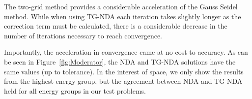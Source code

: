 \DIFdelend %
The two-grid method provides a considerable acceleration of the Gauss Seidel method. \DIFdelbegin {}\DIFdelend While when using TG-NDA each iteration takes slightly longer as the correction term must be calculated, there is a considerable decrease in the number of iterations necessary to reach convergence. 

Importantly, the acceleration in convergence came at no cost to accuracy. As can be seen in Figure~\ref{fig:Moderator}, the NDA and TG-NDA solutions have the same values (up to tolerance). In the interest of space, we only show the results from the highest energy group, but the agreement between NDA and TG-NDA held for all energy groups in our test problems. 
\DIFdelbegin {}%


